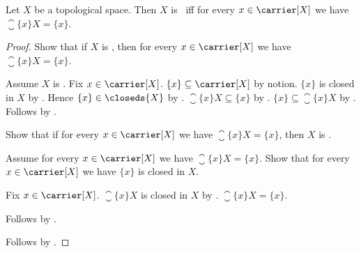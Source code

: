\begin{theorem}\label{teeone_iff_singleton_closures}
    Let $X$ be a topological space.
    Then $X$ is \teeone\ iff for every $x\in\carrier[X]$ we have
        $\closure{\{x\}}{X}=\{x\}$.
\end{theorem}
\begin{proof}
    Show that if $X$ is \teeone, then for every $x\in\carrier[X]$ we have
        $\closure{\{x\}}{X}=\{x\}$.
    \begin{subproof}
        Assume $X$ is \teeone.
        Fix $x\in\carrier[X]$.
        $\{x\}\subseteq\carrier[X]$ by notion.
        $\{x\}$ is closed in $X$ by
            .
        Hence $\{x\}\in\closeds{X}$ by .
        $\closure{\{x\}}{X}\subseteq\{x\}$ by
            .
        $\{x\}\subseteq\closure{\{x\}}{X}$ by
            .
        Follows by .
    \end{subproof}

    Show that if for every $x\in\carrier[X]$ we have
        $\closure{\{x\}}{X}=\{x\}$, then $X$ is \teeone.
    \begin{subproof}
        Assume for every $x\in\carrier[X]$ we have
            $\closure{\{x\}}{X}=\{x\}$.
        Show that for every $x\in\carrier[X]$ we have
            $\{x\}$ is closed in $X$.
        \begin{subproof}
            Fix $x\in\carrier[X]$.
            $\closure{\{x\}}{X}$ is closed in $X$ by
                .
            $\closure{\{x\}}{X}=\{x\}$.
        \end{subproof}
        Follows by .
    \end{subproof}
    Follows by \auto.
\end{proof}

